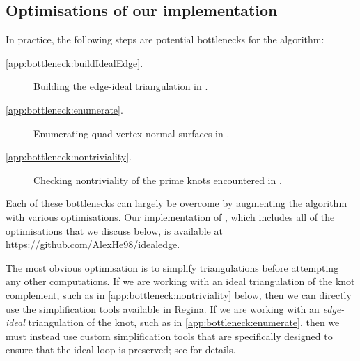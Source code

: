 \documentclass[a4paper,UKenglish,cleveref, autoref, thm-restate]{lipics-v2021}
\begin{document}
\subsection{Optimisations of our implementation}\label{ssec:bottlenecks}

In practice, the following steps are potential bottlenecks for the algorithm:
\begin{description}
\item[\ref{app:bottleneck:buildIdealEdge}.]
Building the edge-ideal triangulation in .
\item[\ref{app:bottleneck:enumerate}.]
Enumerating quad vertex normal surfaces in .
\item[\ref{app:bottleneck:nontriviality}.]
Checking nontriviality of the prime knots encountered in .
\end{description}
Each of these bottlenecks can largely be overcome by augmenting the algorithm with various optimisations.
Our implementation of , which includes all of the optimisations that we discuss below, is available at \url{https://github.com/AlexHe98/idealedge}.

The most obvious optimisation is to simplify triangulations before attempting any other computations. If we are working with an ideal triangulation of the knot complement, such as in \ref{app:bottleneck:nontriviality} below,
then we can directly use the simplification tools available in Regina. If we are working with an \emph{edge-ideal} triangulation of the knot, such as in \ref{app:bottleneck:enumerate},
then we must instead use custom simplification tools that are specifically designed to ensure that the ideal loop is preserved;
see  for details.
\end{document}
